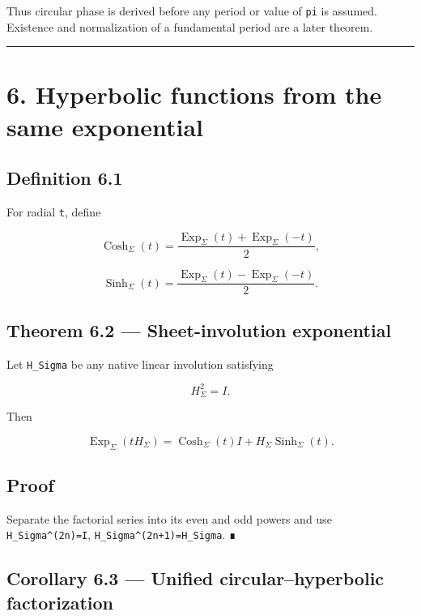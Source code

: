 Thus circular phase is derived before any period or value of \texttt{pi} is assumed.
Existence and normalization of a fundamental period are a later theorem.

\begin{center}\rule{0.5\linewidth}{0.5pt}\end{center}

\hypertarget{hyperbolic-functions-from-the-same-exponential}{%
\section{6. Hyperbolic functions from the same exponential}\label{hyperbolic-functions-from-the-same-exponential}}

\hypertarget{definition-6.1}{%
\subsection{Definition 6.1}\label{definition-6.1}}

For radial \texttt{t}, define

\[
\operatorname{Cosh}_\Sigma(t)
=
\frac{
\operatorname{Exp}_\Sigma(t)
+
\operatorname{Exp}_\Sigma(-t)
}{2},
\]

\[
\operatorname{Sinh}_\Sigma(t)
=
\frac{
\operatorname{Exp}_\Sigma(t)
-
\operatorname{Exp}_\Sigma(-t)
}{2}.
\]

\hypertarget{theorem-6.2-sheet-involution-exponential}{%
\subsection{Theorem 6.2 --- Sheet-involution exponential}\label{theorem-6.2-sheet-involution-exponential}}

Let \texttt{H\_Sigma} be any native linear involution satisfying

\[
H_\Sigma^2=I.
\]

Then

\[
\boxed{
\operatorname{Exp}_\Sigma(tH_\Sigma)
=
\operatorname{Cosh}_\Sigma(t)I
+
H_\Sigma\operatorname{Sinh}_\Sigma(t).
}
\]

\hypertarget{proof-7}{%
\subsection{Proof}\label{proof-7}}

Separate the factorial series into its even and odd powers and use
\texttt{H\_Sigma\^{}(2n)=I}, \texttt{H\_Sigma\^{}(2n+1)=H\_Sigma}. ∎

\hypertarget{corollary-6.3-unified-circularhyperbolic-factorization}{%
\subsection{Corollary 6.3 --- Unified circular--hyperbolic factorization}\label{corollary-6.3-unified-circularhyperbolic-factorization}}

